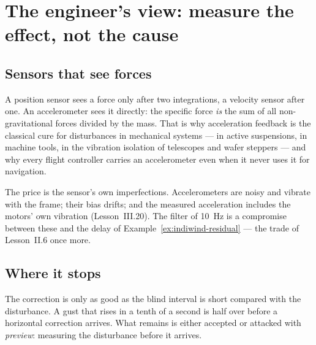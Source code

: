 \section{The engineer's view: measure the effect, not the cause}

\subsection{Sensors that see forces}
A position sensor sees a force only after two integrations, a velocity sensor after one. An accelerometer sees it directly: the specific force \emph{is} the sum of all non-gravitational forces divided by the mass. That is why acceleration feedback is the classical cure for disturbances in mechanical systems — in active suspensions, in machine tools, in the vibration isolation of telescopes and wafer steppers — and why every flight controller carries an accelerometer even when it never uses it for navigation.

The price is the sensor's own imperfections. Accelerometers are noisy and vibrate with the frame; their bias drifts; and the measured acceleration includes the motors' own vibration (Lesson~III.20). The filter of \SI{10}{Hz} is a compromise between these and the delay of Example~\ref{ex:indiwind-residual} — the trade of Lesson~II.6 once more.

\subsection{Where it stops}
The correction is only as good as the blind interval is short compared with the disturbance. A gust that rises in a tenth of a second is half over before a horizontal correction arrives. What remains is either accepted or attacked with \emph{preview}: measuring the disturbance before it arrives.

